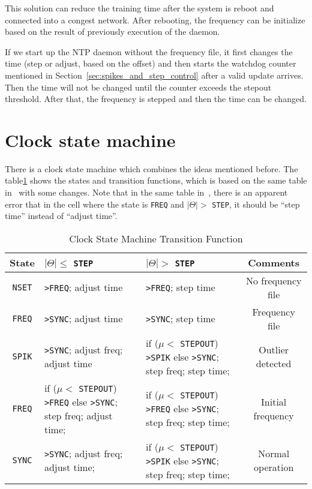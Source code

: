 This solution can reduce the training time after the system is reboot and
connected into a congest network. After rebooting, the frequency can be
initialize based on the result of previously execution of the daemon.  

If we start up the NTP daemon without the frequency file, it first changes the
time (step or adjust, based on the offset) and then starts the watchdog counter
mentioned in Section~\ref{sec:spikes_and_step_control} after a valid update
arrives. Then the time will not be changed until the counter exceeds the
stepout threshold.  After that, the frequency is stepped and then the time can
be changed.

\section{Clock state machine}%
\label{sec:clock_state_machine}
There is a clock state machine which combines the ideas mentioned before. 
The table\ref{tab:clock_state_machine_transition_function} shows the states
and transition functions, which is based on the same table in~\cite{redbook}
with some changes. Note that in the same table in~\cite{rfc5905}, there is an
apparent error that in the cell where the state is \verb|FREQ| and $|\Theta| >$
\verb|STEP|, it should be ``step time'' instead of ``adjust time''.

\begin{table}[ht]
    \centering
    \caption{Clock State Machine Transition Function}
    \label{tab:clock_state_machine_transition_function}
    \begin{tabular}{|c|p{43mm}|p{43mm}|c|}
        \hline
        State &\hfil $|\Theta|\le$ \verb|STEP| & \hfil $|\Theta|>$ \verb|STEP| 
        & Comments \\
        \hline
        \verb|NSET| & \verb|>FREQ|; adjust time & \verb|>FREQ|; step time 
            & No frequency file \\
        \hline
        \verb|FREQ| & \verb|>SYNC|; adjust time & \verb|>SYNC|; step time
            & Frequency file \\
        \hline
        \verb|SPIK| & \verb|>SYNC|; adjust freq; adjust time 
        & if ($\mu <$ \verb|STEPOUT|) \verb|>SPIK| \newline 
        else \verb|>SYNC|; step freq; step time;
        & Outlier detected \\
        \hline
        \verb|FREQ| & if ($\mu <$ \verb|STEPOUT|) \verb|>FREQ| \newline 
        else \verb|>SYNC|; step freq; adjust time;
        & if ($\mu <$ \verb|STEPOUT|) \verb|>FREQ| \newline 
        else \verb|>SYNC|; step freq; step time;
        & Initial frequency \\
        \hline
        \verb|SYNC| & \verb|>SYNC|; adjust freq; adjust time;
        & if ($\mu <$ \verb|STEPOUT|) \verb|>SPIK| \newline 
        else \verb|>SYNC|; step freq; step time; & Normal operation \\
        \hline
    \end{tabular}
\end{table}

